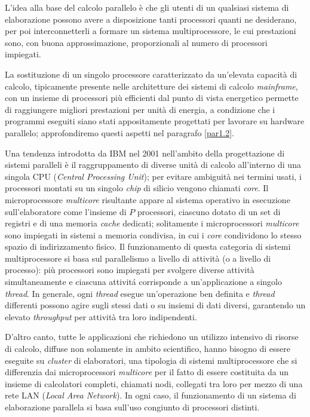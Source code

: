 \nocite{Patterson2022}
\nocite{Silberschatz2014}
L'idea alla base del calcolo parallelo \`e che gli utenti di un qualsiasi sistema di elaborazione possono avere a disposizione tanti processori
quanti ne desiderano, per poi interconnetterli a formare un sistema
multiprocessore, le cui prestazioni sono, con buona approssimazione,
proporzionali al numero di processori impiegati.

La sostituzione di un singolo processore caratterizzato da un'elevata
capacit\`a di calcolo, tipicamente presente nelle architetture dei sistemi di calcolo
\textit{mainframe}, con un insieme di processori pi\`u efficienti
dal punto di vista energetico permette di raggiungere migliori prestazioni
per unit\`a di energia, a condizione che i programmi eseguiti siano stati
appositamente progettati per lavorare su hardware parallelo; approfondiremo questi aspetti nel paragrafo \ref{par1.2}.

Una tendenza introdotta da IBM nel 2001 nell'ambito della progettazione di sistemi paralleli \cite{Tendler2001} è il raggruppamento
di diverse unit\`a di calcolo all'interno di una singola CPU (\textit{Central Processing Unit}); per evitare ambiguit\`a nei termini usati, i processori montati su un singolo \textit{chip} di silicio vengono chiamati \textit{core}.\newline
Il microprocessore \textit{multicore} risultante appare al sistema operativo in esecuzione sull'elaboratore come l'insieme di $P$ processori, ciascuno dotato di un set di registri e di una memoria \textit{cache} dedicati; solitamente i microprocessori \textit{multicore} sono impiegati in sistemi a memoria condivisa, in cui i \textit{core} condividono lo stesso spazio di indirizzamento fisico.\newline
Il funzionamento di questa categoria di sistemi multiprocessore si basa sul parallelismo a livello di attivit\`a (o a livello di processo): pi\`u
processori sono impiegati per svolgere diverse attivit\`a simultaneamente e ciascuna attivit\'a corrisponde a un'applicazione a singolo
\textit{thread}.\newline
In generale, ogni \textit{thread} esegue un'operazione ben definita e \textit{thread} differenti possono agire sugli stessi
dati o su insiemi di dati diversi, garantendo un elevato \textit{throughput} per attivit\`a tra loro indipendenti.

D'altro canto, tutte le applicazioni che richiedono un utilizzo intensivo di risorse di calcolo, diffuse non solamente in ambito
scientifico, hanno bisogno di essere eseguite su \textit{cluster} di elaboratori, una tipologia di sistemi multiprocessore che si differenzia dai microprocessori \textit{multicore} per il fatto di essere costituita da un insieme di calcolatori completi, chiamati nodi, collegati tra loro per mezzo di una rete LAN (\textit{Local Area Network}).\newline
In ogni caso, il funzionamento di un sistema di elaborazione parallela si basa sull'uso congiunto di processori distinti.


